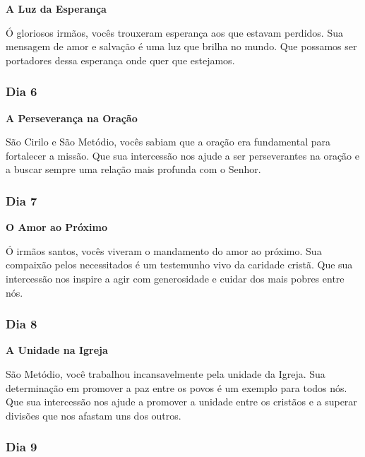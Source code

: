 \documentclass[a4paper,14pt]{extarticle} \usepackage[utf8]{inputenc}
\begin{document}
\textbf{A Luz da Esperança}

Ó gloriosos irmãos, vocês trouxeram esperança aos que estavam perdidos. Sua mensagem de amor e salvação é uma luz que brilha no mundo. Que possamos ser portadores dessa esperança onde quer que estejamos.

\underline{}

\subsubsection{Dia 6}
\underline{}

\textbf{A Perseverança na Oração}

São Cirilo e São Metódio, vocês sabiam que a oração era fundamental para fortalecer a missão. Que sua intercessão nos ajude a ser perseverantes na oração e a buscar sempre uma relação mais profunda com o Senhor.

\underline{}

\subsubsection{Dia 7}
\underline{}

\textbf{O Amor ao Próximo}

Ó irmãos santos, vocês viveram o mandamento do amor ao próximo. Sua compaixão pelos necessitados é um testemunho vivo da caridade cristã. Que sua intercessão nos inspire a agir com generosidade e cuidar dos mais pobres entre nós.

\underline{}

\subsubsection{Dia 8}
\underline{}

\textbf{A Unidade na Igreja}

São Metódio, você trabalhou incansavelmente pela unidade da Igreja. Sua determinação em promover a paz entre os povos é um exemplo para todos nós. Que sua intercessão nos ajude a promover a unidade entre os cristãos e a superar divisões que nos afastam uns dos outros.


\underline{}

\subsubsection{Dia 9}
\underline{}
\end{document}
